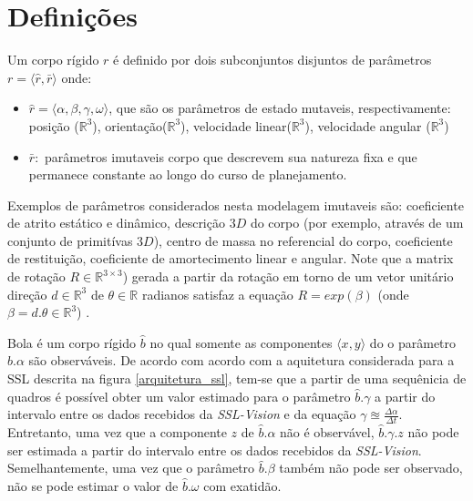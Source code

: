 \section{Definições}

\begin{defi}
  Um corpo rígido $r$ é definido por dois subconjuntos disjuntos
  de parâmetros $r= \langle \hat{r}, \bar{r} \rangle$ onde:
  \begin{itemize}
    \item $\hat{r} = \langle \alpha, \beta, \gamma, \omega \rangle$,
    que são os parâmetros de estado mutaveis, respectivamente:
    posição ($\mathbb{R} ^{3}$), orientação($\mathbb{R} ^{3}$),
    velocidade linear($\mathbb{R} ^{3}$), velocidade angular
    ($\mathbb{R} ^{3}$)
    
    \item $\bar{r} :$ parâmetros imutaveis corpo que descrevem sua
    natureza fixa e que permanece constante ao longo do curso de 
    planejamento.
  \end{itemize}
  
  Exemplos de parâmetros considerados nesta modelagem imutaveis são:
  coeficiente de atrito estático e dinâmico, descrição $3D$ do corpo
  (por exemplo, através de um conjunto de primitívas $3D$), centro de
  massa no referencial do corpo, coeficiente de restituição,
  coeficiente de amortecimento linear e angular. Note que a matrix de
  rotação $R\in\mathbb{R}^{3\times 3}$) gerada a partir da rotação
  em torno de um vetor unitário direção $d\in\mathbb{R}^{3}$  de
  $\theta \in \mathbb{R}$ radianos satisfaz a equação
  $R = exp\left( \beta \right)$ (onde $\beta = d. \theta \in \mathbb{R} ^{3}$)
  \cite{math2robotics}.
\end{defi}

\begin{defi}[Bola]\label{def:bola}
  Bola é um corpo rígido $\hat{b}$ no qual somente as componentes 
  $\langle x,y \rangle$ do o parâmetro $\hat{b}.\alpha$ são
  observáveis. De acordo com acordo com a
  aquitetura considerada para a SSL descrita na figura
  \ref{arquitetura_ssl}, tem-se que a partir de uma sequênicia
  de quadros é possível obter um valor estimado para o parâmetro
  $\hat{b}.\gamma$ a partir do intervalo entre os dados recebidos
  da \textit{SSL-Vision} e da equação $ \gamma \approxeq 
  \frac{\Delta \alpha}{\Delta t} $. Entretanto, uma vez que a componente
  $z$ de $\hat{b}.\alpha$ não é observável, $\hat{b}.\gamma.z$ 
  não pode ser estimada a partir do intervalo entre os dados recebidos
  da \textit{SSL-Vision}. Semelhantemente,  uma vez que o
  parâmetro $\hat{b}.\beta$ também não pode ser observado,
  não se pode estimar o valor de $\hat{b}.\omega$ com exatidão.
\end{defi}

